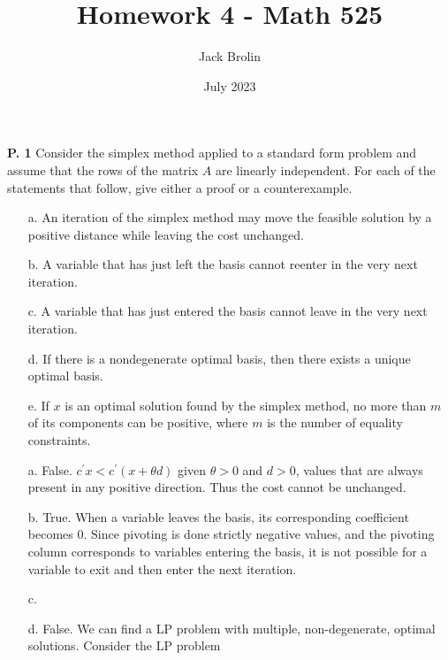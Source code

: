 \documentclass{article}
\title{Homework 4 - Math 525}
\author{Jack Brolin}
\date{July 2023}
\begin{document}
\maketitle

\begin{jacklist}
    \begin{framed} 
    \item [\textbf{P. 1}] Consider the simplex method applied to a standard form problem and assume that the rows of the matrix 
        $A$ are linearly independent. For each of the statements that follow, give either a proof or a counterexample.
        \begin{itemize}
            \item [a.] An iteration of the simplex method may move the feasible solution by a positive distance while leaving 
                the cost unchanged.
            \item [b.] A variable that has just left the basis cannot reenter in the very next iteration.
            \item [c.] A variable that has just entered the basis cannot leave in the very next iteration.
            \item [d.] If there is a nondegenerate optimal basis, then there exists a unique optimal basis.
            \item [e.] If $x$ is an optimal solution found by the simplex method, no more than $m$ of its components can be positive, 
                where $m$ is the number of equality constraints.
        \end{itemize}
    \end{framed}
    \begin{itemize}
        \item [a.] False. $c^\prime x < c^\prime(x + \theta d)$ given $\theta > 0$ and $d > 0$, values that are always 
            present in any positive direction. Thus the cost cannot be unchanged.
        \item [b.] True. When a variable leaves the basis, its corresponding coefficient becomes 0. Since pivoting is done strictly 
            negative values, and the pivoting column corresponds to variables entering the basis, it is not possible for a variable to 
            exit and then enter the next iteration. 
        \item [c.]
        \item [d.] False. We can find a LP problem with multiple, non-degenerate, optimal solutions. Consider the LP problem 
            \begin{align*}

\end{align*}
\end{itemize}
\end{jacklist}
\end{document}
